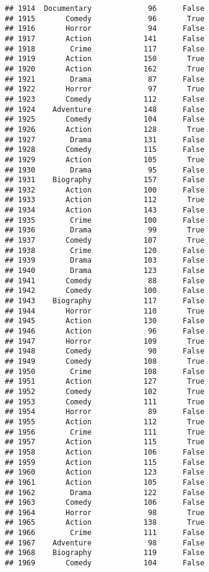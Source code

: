 \documentclass[
]{article}
\begin{document}
\begin{verbatim}
## 1914  Documentary             96      False
## 1915       Comedy             96       True
## 1916       Horror             94      False
## 1917       Action            141      False
## 1918        Crime            117      False
## 1919       Action            150       True
## 1920       Action            162       True
## 1921        Drama             87      False
## 1922       Horror             97       True
## 1923       Comedy            112      False
## 1924    Adventure            148      False
## 1925       Comedy            104      False
## 1926       Action            128       True
## 1927        Drama            131      False
## 1928       Comedy            115      False
## 1929       Action            105       True
## 1930        Drama             95      False
## 1931    Biography            157      False
## 1932       Action            100      False
## 1933       Action            112       True
## 1934       Action            143      False
## 1935        Crime            100      False
## 1936        Drama             99       True
## 1937       Comedy            107       True
## 1938        Crime            120      False
## 1939        Drama            103      False
## 1940        Drama            123      False
## 1941       Comedy             88      False
## 1942       Comedy            100      False
## 1943    Biography            117      False
## 1944       Horror            110       True
## 1945       Action            130      False
## 1946       Action             96      False
## 1947       Horror            109       True
## 1948       Comedy             90      False
## 1949       Comedy            108       True
## 1950        Crime            108      False
## 1951       Action            127       True
## 1952       Comedy            102       True
## 1953       Comedy            111       True
## 1954       Horror             89      False
## 1955       Action            112       True
## 1956        Crime            111       True
## 1957       Action            115       True
## 1958       Action            106      False
## 1959       Action            115      False
## 1960       Action            123      False
## 1961       Action            105      False
## 1962        Drama            122      False
## 1963       Comedy            106      False
## 1964       Horror             98       True
## 1965       Action            138       True
## 1966        Crime            111      False
## 1967    Adventure             98      False
## 1968    Biography            119      False
## 1969       Comedy            104      False

\end{verbatim}
\end{document}
